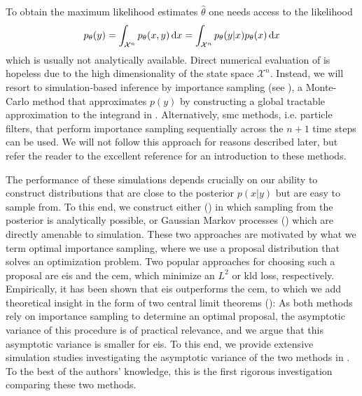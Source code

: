 To obtain the maximum likelihood estimates $\hat\theta$ one needs access to the likelihood
\begin{align}
    \label{eq:likelihood}
    p_{\theta}(y) = \int_{\mathcal X^n} p_{\theta}(x,y) \,\mathrm d x = \int_{\mathcal X^{n}} p_{\theta}(y|x) p_{\theta}(x) \,\mathrm d x
\end{align}
which is usually not analytically available.
Direct numerical evaluation of  is hopeless due to the high dimensionality of the state space $\mathcal X^n$.
Instead, we will resort to simulation-based inference by importance sampling (see ), a Monte-Carlo method that approximates $p(y)$ by constructing a global tractable approximation to the integrand in . Alternatively, \gls{smc} methods, i.e. particle filters, that perform importance sampling sequentially across the $n + 1$ time steps can be used. We will not follow this approach for reasons described later, but refer the reader to the excellent reference \citep{Chopin2020Introduction} for an introduction to these methods.

The performance of these simulations depends crucially on our ability to construct distributions that are close to the posterior $p(x|y)$ but are easy to sample from. To this end, we construct either  () in which sampling from the posterior is analytically possible, or Gaussian Markov processes () which are directly amenable to simulation.
These two approaches are motivated by what we term \glqq{}optimal importance sampling\grqq{}, where we use a proposal distribution that solves an optimization problem. Two popular approaches for choosing such a proposal are \acrlong{eis} and the \acrlong{cem}, which minimize an $L^{2}$ or \acrshort{kld} loss, respectively. Empirically, it has been shown that \acrshort{eis} outperforms the \acrshort{cem}, to which we add theoretical insight in the form of two central limit theorems (): As both methods rely on importance sampling to determine an optimal proposal, the asymptotic variance of this procedure is of practical relevance, and we argue that this asymptotic variance is smaller for \acrshort{eis}.
To this end, we provide extensive simulation studies investigating the asymptotic variance of the two methods in . 
To the best of the authors' knowledge, this is the first rigorous investigation comparing these two methods. 

